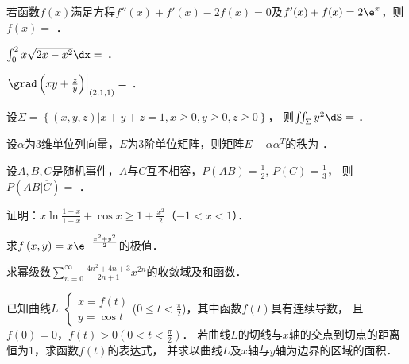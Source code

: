 \documentclass[plain,noanswer,medmath]{../../template/jnuexam}
\begin{document}


\begin{problem}
若函数$f(x)$满足方程$f''(x) + f'(x) - 2f(x) = 0$及$f'(x) + f(x) = 2\e^x$，则$f(x) =$ \fillin{}．
\end{problem}


\begin{problem}
$\int_0^2 x\sqrt{2x - x^2} \dx =$ \fillin{}．
\end{problem}


\begin{problem}
$\left.\grad\left(xy + \frac{z}{y} \right) \right|_{(2,1,1)} =$ \fillin{}．
\end{problem}


\begin{problem}
设$\Sigma = \left\{\left(x,y,z \right)\left| x + y + z = 1,x \ge 0,y \ge 0,z \ge 0 \right. \right\}$，
则$\iint_{\Sigma}y^2 \dS =$ \fillin{}．
\end{problem}


\begin{problem}
设$\alpha$为$3$维单位列向量，$E$为$3$阶单位矩阵，则矩阵$E - \alpha \alpha^T$的秩为 \fillin{}．
\end{problem}


\begin{problem}
设$A,B,C$是随机事件，$A$与$C$互不相容，$P(AB) = \frac{1}{2}$, $P(C) = \frac{1}{3}$，
则$P(AB|\overline{C}) =$ \fillin{}．
\end{problem}




\begin{problem}[points=10]
证明：$x\ln \frac{1 + x}{1 - x} + \cos x \ge 1 + \frac{x^2}{2}$（$- 1 < x < 1$）．
\end{problem}


\begin{problem}[points=10]
求$f\left(x,y \right) = x\e^{- \frac{x^2 + y^2}{2}}$的极值．
\end{problem}


\begin{problem}[points=10]
求幂级数$\sum_{n = 0}^{\infty}\frac{4n^2 + 4n + 3}{2n + 1}x^{2n}$的收敛域及和函数．
\end{problem}


\begin{problem}[points=10]
已知曲线$L:\begin{cases}
  x = f(t) \\
  y = \cos t
\end{cases}$($0 \le t < \frac{\pi}{2}$)，其中函数$f(t)$具有连续导数，
且$f(0) = 0$，$f(t) > 0\left(0 < t < \frac{\pi}{2} \right)$．
若曲线$L$的切线与$x$轴的交点到切点的距离恒为$1$，求函数$f(t)$的表达式，
并求以曲线$L$及$x$轴与$y$轴为边界的区域的面积．
\end{problem}
\end{document}
